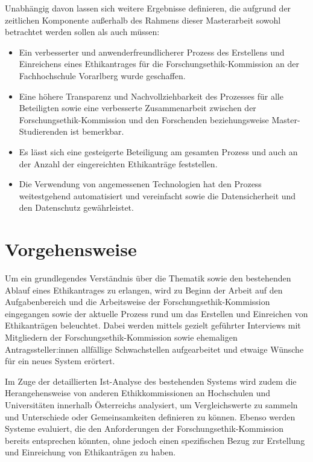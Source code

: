 \documentclass[a4paper,12pt,twoside]{scrreprt}
\begin{document}
\medskip

Unabhängig davon lassen sich weitere Ergebnisse definieren, die aufgrund der zeitlichen Komponente außerhalb des Rahmens dieser Masterarbeit sowohl betrachtet werden sollen als auch müssen:
\begin{itemize}
    \item Ein verbesserter und anwenderfreundlicherer Prozess des Erstellens und Einreichens eines Ethikantrages für die Forschungsethik-Kommission an der Fachhochschule Vorarlberg wurde geschaffen.
    \item Eine höhere Transparenz und Nachvollziehbarkeit des Prozesses für alle Beteiligten sowie eine verbesserte Zusammenarbeit zwischen der Forschungsethik-Kommission und den Forschenden beziehungsweise Master-Studierenden ist bemerkbar.
    \item Es lässt sich eine gesteigerte Beteiligung am gesamten Prozess und auch an der Anzahl der eingereichten Ethikanträge feststellen.
    \item Die Verwendung von angemessenen Technologien hat den Prozess weitestgehend automatisiert und vereinfacht sowie die Datensicherheit und den Datenschutz gewährleistet.
\end{itemize}

\section{Vorgehensweise}
\label{sec:vorgehensweise}

Um ein grundlegendes Verständnis über die Thematik sowie den bestehenden Ablauf eines Ethikantrages zu erlangen, wird zu Beginn der Arbeit auf den Aufgabenbereich und die Arbeitsweise der Forschungsethik-Kommission eingegangen sowie der aktuelle Prozess rund um das Erstellen und Einreichen von Ethikanträgen beleuchtet. Dabei werden mittels gezielt geführter Interviews mit Mitgliedern der Forschungsethik-Kommission sowie ehemaligen Antragssteller:innen allfällige Schwachstellen aufgearbeitet und etwaige Wünsche für ein neues System erörtert.

Im Zuge der detaillierten Ist-Analyse des bestehenden Systems wird zudem die Herangehensweise von anderen Ethikkommissionen an Hochschulen und Universitäten innerhalb Österreichs analysiert, um Vergleichswerte zu sammeln und Unterschiede oder Gemeinsamkeiten definieren zu können. Ebenso werden Systeme evaluiert, die den Anforderungen der Forschungsethik-Kommission bereits entsprechen könnten, ohne jedoch einen spezifischen Bezug zur Erstellung und Einreichung von Ethikanträgen zu haben.
\end{document}

